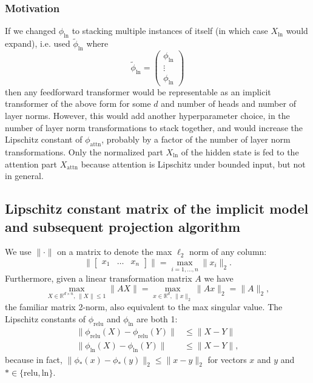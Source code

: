 \documentclass{article}
\begin{document}
\subsubsection{Motivation}
If we changed $\phi_\text{ln}$ to stacking multiple instances of itself
(in which case $X_\text{ln}$ would expand), i.e.
used $\tilde\phi_\text{ln}$ where 
\begin{equation*}
  \tilde\phi_\text{ln} = \begin{pmatrix} \phi_\text{ln} \\ \vdots
    \\ \phi_\text{ln}\end{pmatrix}
\end{equation*}
then any feedforward transformer would be representable as an implicit 
transformer of the above form for some $d$ and number of heads and number 
of layer norms. However, this would add another hyperparameter
choice, in the number of layer norm transformations to stack together, and 
would increase the Lipschitz constant of $\phi_\text{attn}$, probably by a 
factor of the number of layer norm transformations.
Only the normalized part $X_\text{ln}$ of the hidden state is fed to the
attention part $X_\text{attn}$ because attention is Lipschitz under bounded
input, but not in general.
\subsection{Lipschitz constant matrix of the implicit model and subsequent projection algorithm}
We use $\|\cdot\|$ on a matrix to denote the max $\ell_2$ norm of any column:
\begin{equation*}
  \|\begin{bmatrix} x_1 & \ldots & x_n\end{bmatrix} \| = \max_{i=1,\ldots,n} \|x_i\|_2.
\end{equation*}
Furthermore, given a linear transformation matrix $A$ we have 
\begin{equation*}
  \max_{X\in\mathbb R^{d\times n},\, \|X\|\leq 1} \|AX\| = 
  \max_{x\in\mathbb R^d,\, \|x\|_2} \|Ax\|_2 = \|A\|_2,
\end{equation*}
the familiar matrix 2-norm, also equivalent to the max singular value.
The Lipschitz constants of $\phi_\text{relu}$ and $\phi_\text{ln}$ are both 1:
\begin{align*}
  \|\phi_\text{relu}(X) - \phi_\text{relu}(Y)\| &\leq \|X - Y\|\\
  \|\phi_\text{ln}(X) - \phi_\text{ln}(Y)\| &\leq \|X - Y\|,
\end{align*}
because in fact, $\|\phi_*(x) - \phi_*(y)\|_2 \leq \|x-y\|_2$ for vectors 
$x$ and $y$ and $*\in\{\text{relu}, \text{ln}\}$.
\end{document}
